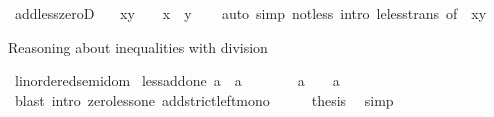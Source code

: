 \begin{isabellebody}
%
\endisadelimproof
\isanewline
{}\isamarkupfalse%
\ add{\isacharunderscore}{\kern0pt}less{\isacharunderscore}{\kern0pt}zeroD{\isacharcolon}{\kern0pt}\isanewline
\ \ \ {\isachardoublequoteopen}x{\isacharplus}{\kern0pt}y\ {\isacharless}{\kern0pt}\ {}\ {\isasymLongrightarrow}\ x{\isacharless}{\kern0pt}{}\ {\isasymor}\ y{\isacharless}{\kern0pt}{}{\isachardoublequoteclose}\isanewline
%
\isadelimproof
\ \ %
\endisadelimproof
%
\isatagproof
{}\isamarkupfalse%
\ {\isacharparenleft}{\kern0pt}auto\ simp{\isacharcolon}{\kern0pt}\ not{\isacharunderscore}{\kern0pt}less\ intro{\isacharcolon}{\kern0pt}\ le{\isacharunderscore}{\kern0pt}less{\isacharunderscore}{\kern0pt}trans\ {\isacharbrackleft}{\kern0pt}of\ {\isacharunderscore}{\kern0pt}\ {\isachardoublequoteopen}x{\isacharplus}{\kern0pt}y{\isachardoublequoteclose}{\isacharbrackright}{\kern0pt}{\isacharparenright}{\kern0pt}%
\endisatagproof
{\isafoldproof}%
%
\isadelimproof
\isanewline
%
\endisadelimproof
\isanewline
{}\isamarkupfalse%
%
\begin{isamarkuptext}%
Reasoning about inequalities with division%
\end{isamarkuptext}\isamarkuptrue%
\isamarkupfalse%
\ linordered{\isacharunderscore}{\kern0pt}semidom\isanewline
{}\isanewline
\isanewline
{}\isamarkupfalse%
\ less{\isacharunderscore}{\kern0pt}add{\isacharunderscore}{\kern0pt}one{\isacharcolon}{\kern0pt}\ {\isachardoublequoteopen}a\ {\isacharless}{\kern0pt}\ a\ {\isacharplus}{\kern0pt}\ {}{\isachardoublequoteclose}\isanewline
%
\isadelimproof
%
\endisadelimproof
%
\isatagproof
{}\isamarkupfalse%
\ {\isacharminus}{\kern0pt}\isanewline
\ \ \isamarkupfalse%
\ {\isachardoublequoteopen}a\ {\isacharplus}{\kern0pt}\ {}\ {\isacharless}{\kern0pt}\ a\ {\isacharplus}{\kern0pt}\ {}{\isachardoublequoteclose}\isanewline
\ \ \ \ \isamarkupfalse%
\ {\isacharparenleft}{\kern0pt}blast\ intro{\isacharcolon}{\kern0pt}\ zero{\isacharunderscore}{\kern0pt}less{\isacharunderscore}{\kern0pt}one\ add{\isacharunderscore}{\kern0pt}strict{\isacharunderscore}{\kern0pt}left{\isacharunderscore}{\kern0pt}mono{\isacharparenright}{\kern0pt}\isanewline
\ \ \isamarkupfalse%
\ \isamarkupfalse%
\ {\isacharquery}{\kern0pt}thesis\ \isamarkupfalse%
\ simp\isanewline
{}\isamarkupfalse%
%
\endisatagproof
{\isafoldproof}%
%
\isadelimproof
\isanewline

\end{isabellebody}
